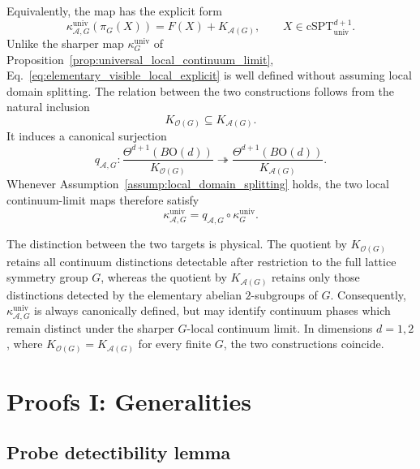 \documentclass[aps,prx,reprint,superscriptaddress,twocolumn,amsmath,amssymb,amsfonts, nofootinbib]{revtex4-2}
\newcommand{\csptu}{\mathrm{cSPT}^{d+1}_{\mathrm{univ}}}
\theoremstyle{apsstyle}
\begin{document}
Equivalently, the map has the explicit form
\begin{equation}
    \kappa^{\mathrm{univ}}_{\mathcal A,G}
    \left(\pi_G(X)\right)
    =
    F(X)+K_{\mathcal A(G)},
    \qquad
    X\in\csptu.
    \label{eq:elementary_visible_local_explicit}
\end{equation}
Unlike the sharper map
$\kappa_G^{\mathrm{univ}}$ of
Proposition~\ref{prop:universal_local_continuum_limit},
Eq.~\ref{eq:elementary_visible_local_explicit} is well defined without assuming local domain splitting. The relation between the two constructions follows from the natural inclusion
\begin{equation*}
    K_{\mathcal O(G)}
    \subseteq
    K_{\mathcal A(G)}.
\end{equation*}
It induces a canonical surjection
\begin{equation}
    q_{\mathcal A,G}:
    \frac{\Theta^{d+1}(B\mathrm{O}(d))}
    {K_{\mathcal O(G)}}
    \twoheadrightarrow
    \frac{\Theta^{d+1}(B\mathrm{O}(d))}
    {K_{\mathcal A(G)}}.
    \label{eq:strong_to_elementary_quotient}
\end{equation}
Whenever Assumption~\ref{assump:local_domain_splitting} holds, the two local continuum-limit maps therefore satisfy
\begin{equation}
    \kappa^{\mathrm{univ}}_{\mathcal A,G}
    =
    q_{\mathcal A,G}
    \circ
    \kappa_G^{\mathrm{univ}}.
    \label{eq:local_maps_relation}
\end{equation}

The distinction between the two targets is physical. The quotient by
$K_{\mathcal O(G)}$ retains all continuum distinctions detectable after restriction to the full lattice symmetry group $G$, whereas the quotient by
$K_{\mathcal A(G)}$ retains only those distinctions detected by the elementary abelian $2$-subgroups of $G$. Consequently,
$\kappa^{\mathrm{univ}}_{\mathcal A,G}$ is always canonically defined, but may identify continuum phases which remain distinct under the sharper $G$-local continuum limit. In dimensions $d=1,2$, where
$K_{\mathcal O(G)}=K_{\mathcal A(G)}$ for every finite $G$, the two constructions coincide.



\section{Proofs I: Generalities}
\label{app:proofs1}

\subsection{Probe detectibility lemma}
\label{app:probe_detectibility}
\end{document}
